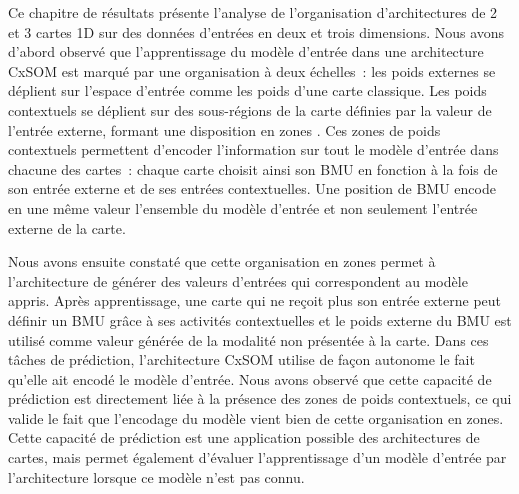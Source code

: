\documentclass[../main]{subfiles}
\begin{document}
Ce chapitre de résultats présente l'analyse de l'organisation d'architectures de 2 et 3 cartes 1D sur des données d'entrées en deux et trois dimensions.
Nous avons d'abord observé que l'apprentissage du modèle d'entrée dans une architecture CxSOM est marqué par une organisation à deux échelles~: les poids externes se déplient sur l'espace d'entrée comme les poids d'une carte classique. Les poids contextuels se déplient sur des sous-régions de la carte définies par la valeur de l'entrée externe, formant une disposition en \og zones \fg{}.
Ces zones de poids contextuels permettent d'encoder l'information sur tout le modèle d'entrée dans chacune des cartes~: 
chaque carte choisit ainsi son BMU en fonction à la fois de son entrée externe et de ses entrées contextuelles. Une position de BMU encode en une même valeur l'ensemble du modèle d'entrée et non seulement l'entrée externe de la carte.


Nous avons ensuite constaté que cette organisation en zones permet à l'architecture de générer des valeurs d'entrées qui correspondent au modèle appris.
Après apprentissage, une carte qui ne reçoit plus son entrée externe peut définir un BMU grâce à ses activités contextuelles et le poids externe du BMU est utilisé comme valeur générée de la modalité non présentée à la carte.
Dans ces tâches de prédiction, l'architecture CxSOM utilise de façon autonome le fait qu'elle ait encodé le modèle d'entrée. 
Nous avons observé que cette capacité de prédiction est directement liée à la présence des zones de poids contextuels, ce qui valide le fait que l'encodage du modèle vient bien de cette organisation en zones.
Cette capacité de prédiction est une application possible des architectures de cartes, mais permet également d'évaluer l'apprentissage d'un modèle d'entrée par l'architecture lorsque ce modèle n'est pas connu.
\end{document}
